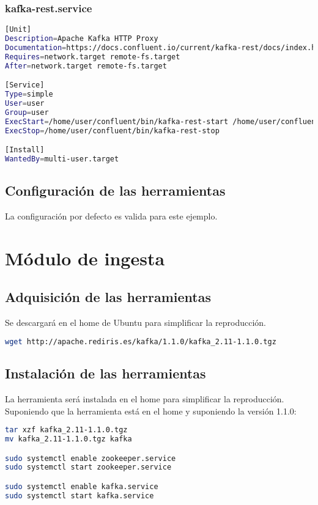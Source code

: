 \subsubsection{kafka-rest.service}
\begin{lstlisting}[language=Bash, breaklines=true]
[Unit]
Description=Apache Kafka HTTP Proxy
Documentation=https://docs.confluent.io/current/kafka-rest/docs/index.html
Requires=network.target remote-fs.target
After=network.target remote-fs.target

[Service]
Type=simple
User=user
Group=user
ExecStart=/home/user/confluent/bin/kafka-rest-start /home/user/confluent/etc/kafka-rest/kafka-rest.properties
ExecStop=/home/user/confluent/bin/kafka-rest-stop

[Install]
WantedBy=multi-user.target
\end{lstlisting}

\subsection{Configuración de las herramientas}
La configuración por defecto es valida para este ejemplo.


\section{Módulo de ingesta}
\subsection{Adquisición de las herramientas}
Se descargará en el home de Ubuntu para simplificar la reproducción.
\begin{lstlisting}[language=Bash]
wget http://apache.rediris.es/kafka/1.1.0/kafka_2.11-1.1.0.tgz
\end{lstlisting}

\subsection{Instalación de las herramientas}
La herramienta será instalada en el home para simplificar la reproducción. Suponiendo que la herramienta está en el home y suponiendo la versión 1.1.0:
\begin{lstlisting}[language=Bash]
tar xzf kafka_2.11-1.1.0.tgz
mv kafka_2.11-1.1.0.tgz kafka

sudo systemctl enable zookeeper.service
sudo systemctl start zookeeper.service

sudo systemctl enable kafka.service
sudo systemctl start kafka.service
\end{lstlisting}

